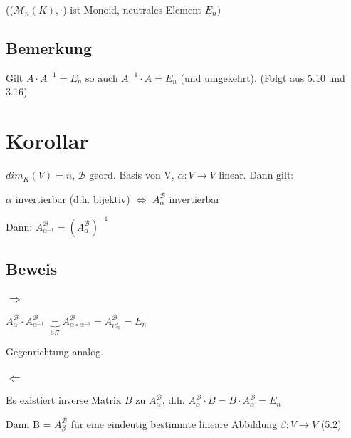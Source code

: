 \documentclass[a4paper, openany]{book}
\begin{document}
        (($\mathcal{M}_n (K), \cdot$) ist Monoid, neutrales Element $E_n$)

        \subsection{Bemerkung}

        Gilt $A \cdot A^{-1} = E_n$ so auch $A^{-1} \cdot A = E_n$ (und umgekehrt). (Folgt aus 5.10 und 3.16)

        \section{Korollar}

        $dim_K(V) = n$, $\mathcal{B}$ geord. Basis von V, $\alpha : V \rightarrow V$ linear. Dann gilt:

        \begin{center}
          $\alpha$ invertierbar (d.h. bijektiv) $\Leftrightarrow$ $A_{\alpha}^{\mathcal{B}}$ invertierbar
        \end{center}

        Dann: $A_{\alpha^{-1}}^{\mathcal{B}} = (A_{\alpha}^{\mathcal{B}})^{-1}$

        \subsection{Beweis}

        \subsubsection*{$\Rightarrow$}

        $A_{\alpha}^{\mathcal{B}} \cdot A_{\alpha^{-1}}^{\mathcal{B}}$ $\underbrace{=}_{5.7} A_{\alpha \circ \alpha^{-1}}^{\mathcal{B}} = A_{id_y}^{\mathcal{B}} = E_n$

        Gegenrichtung analog.

        \subsubsection*{$\Leftarrow$}

        Es existiert inverse Matrix $B$ zu $A_{\alpha}^{\mathcal{B}}$, d.h. $A_{\alpha}^{\mathcal{B}} \cdot B = B \cdot A_{\alpha}^{\mathcal{B}} = E_n$

        Dann B = $A_{\beta}^{\mathcal{B}}$ für eine eindeutig bestimmte lineare Abbildung $\beta : V \rightarrow V$ (5.2)
\end{document}
